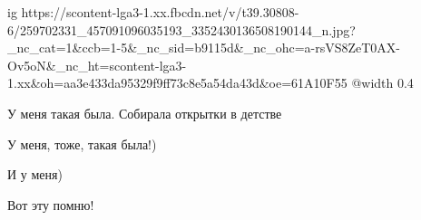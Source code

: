  
 
 
 
 
\ifcmt
  ig https://scontent-lga3-1.xx.fbcdn.net/v/t39.30808-6/259702331_457091096035193_3352430136508190144_n.jpg?_nc_cat=1&ccb=1-5&_nc_sid=b9115d&_nc_ohc=a-rsVS8ZeT0AX-Ov5oN&_nc_ht=scontent-lga3-1.xx&oh=aa3e433da95329f9ff73c8e5a54da43d&oe=61A10F55
  @width 0.4
\fi

У меня такая была. Собирала открытки в детстве

У меня, тоже, такая была!)

И у меня)

Вот эту помню!
